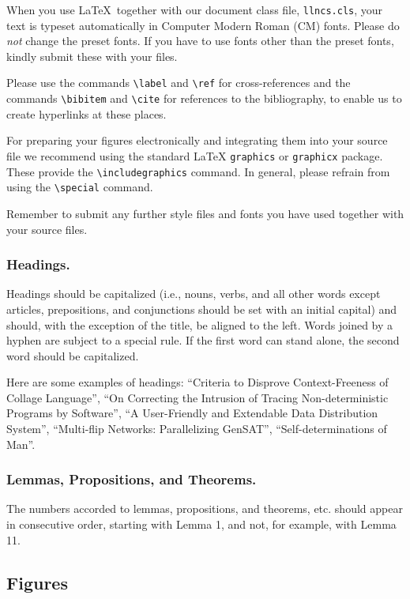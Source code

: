 \documentclass[runningheads,a4paper]{llncs}
\begin{document}
When you use \LaTeX\ together with our document class file,
\texttt{llncs.cls},
your text is typeset automatically in Computer Modern Roman (CM) fonts.
Please do
\emph{not} change the preset fonts. If you have to use fonts other
than the preset fonts, kindly submit these with your files.

Please use the commands \verb+\label+ and \verb+\ref+ for
cross-references and the commands \verb+\bibitem+ and \verb+\cite+ for
references to the bibliography, to enable us to create hyperlinks at
these places.

For preparing your figures electronically and integrating them into
your source file we recommend using the standard \LaTeX{} \verb+graphics+ or
\verb+graphicx+ package. These provide the \verb+\includegraphics+ command.
In general, please refrain from using the \verb+\special+ command.

Remember to submit any further style files and
fonts you have used together with your source files.

\subsubsection{Headings.}

Headings should be capitalized
(i.e., nouns, verbs, and all other words
except articles, prepositions, and conjunctions should be set with an
initial capital) and should,
with the exception of the title, be aligned to the left.
Words joined by a hyphen are subject to a special rule. If the first
word can stand alone, the second word should be capitalized.

Here are some examples of headings: ``Criteria to Disprove
Context-Freeness of Collage Language'', ``On Correcting the Intrusion of
Tracing Non-deterministic Programs by Software'', ``A User-Friendly and
Extendable Data Distribution System'', ``Multi-flip Networks:
Parallelizing GenSAT'', ``Self-determinations of Man''.

\subsubsection{Lemmas, Propositions, and Theorems.}

The numbers accorded to lemmas, propositions, and theorems, etc. should
appear in consecutive order, starting with Lemma 1, and not, for
example, with Lemma 11.

\subsection{Figures}
\end{document}
